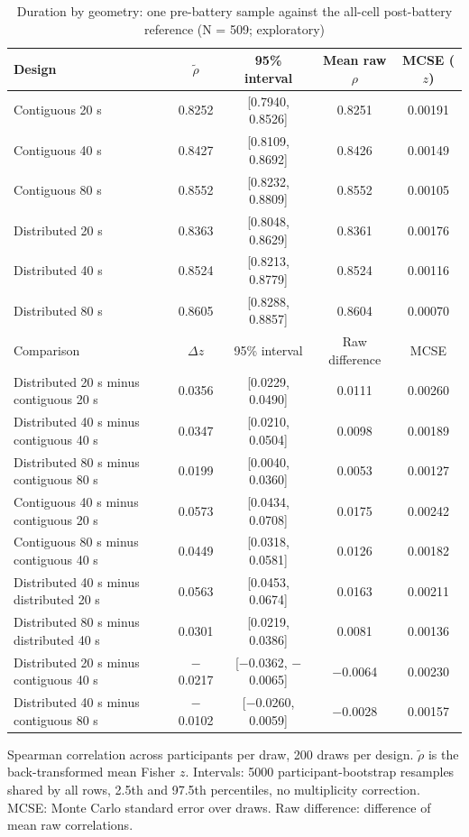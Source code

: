 \begin{table}[H]
\centering
\caption{Duration by geometry: one pre-battery sample against the all-cell post-battery reference (N = 509; exploratory)}
\label{tab:duration_geometry}
\small
\begin{tabular}{lcccc}
\toprule
Design & $\widetilde{\rho}$ & 95\% interval & Mean raw $\rho$ & MCSE ($z$) \\
\midrule
Contiguous 20 s & 0.8252 & [0.7940, 0.8526] & 0.8251 & 0.00191 \\
Contiguous 40 s & 0.8427 & [0.8109, 0.8692] & 0.8426 & 0.00149 \\
Contiguous 80 s & 0.8552 & [0.8232, 0.8809] & 0.8552 & 0.00105 \\
Distributed 20 s & 0.8363 & [0.8048, 0.8629] & 0.8361 & 0.00176 \\
Distributed 40 s & 0.8524 & [0.8213, 0.8779] & 0.8524 & 0.00116 \\
Distributed 80 s & 0.8605 & [0.8288, 0.8857] & 0.8604 & 0.00070 \\
\midrule
Comparison & $\Delta z$ & 95\% interval & Raw difference & MCSE \\
\midrule
Distributed 20 s minus contiguous 20 s & 0.0356 & [0.0229, 0.0490] & 0.0111 & 0.00260 \\
Distributed 40 s minus contiguous 40 s & 0.0347 & [0.0210, 0.0504] & 0.0098 & 0.00189 \\
Distributed 80 s minus contiguous 80 s & 0.0199 & [0.0040, 0.0360] & 0.0053 & 0.00127 \\
\addlinespace
Contiguous 40 s minus contiguous 20 s & 0.0573 & [0.0434, 0.0708] & 0.0175 & 0.00242 \\
Contiguous 80 s minus contiguous 40 s & 0.0449 & [0.0318, 0.0581] & 0.0126 & 0.00182 \\
Distributed 40 s minus distributed 20 s & 0.0563 & [0.0453, 0.0674] & 0.0163 & 0.00211 \\
Distributed 80 s minus distributed 40 s & 0.0301 & [0.0219, 0.0386] & 0.0081 & 0.00136 \\
\addlinespace
Distributed 20 s minus contiguous 40 s & $-$0.0217 & [$-$0.0362, $-$0.0065] & $-$0.0064 & 0.00230 \\
Distributed 40 s minus contiguous 80 s & $-$0.0102 & [$-$0.0260, 0.0059] & $-$0.0028 & 0.00157 \\
\bottomrule
\end{tabular}
\par\smallskip
\begin{minipage}{\textwidth}\footnotesize Spearman correlation across participants per draw, 200 draws per design. $\widetilde{\rho}$ is the back-transformed mean Fisher $z$. Intervals: 5000 participant-bootstrap resamples shared by all rows, 2.5th and 97.5th percentiles, no multiplicity correction. MCSE: Monte Carlo standard error over draws. Raw difference: difference of mean raw correlations.\end{minipage}
\end{table}
